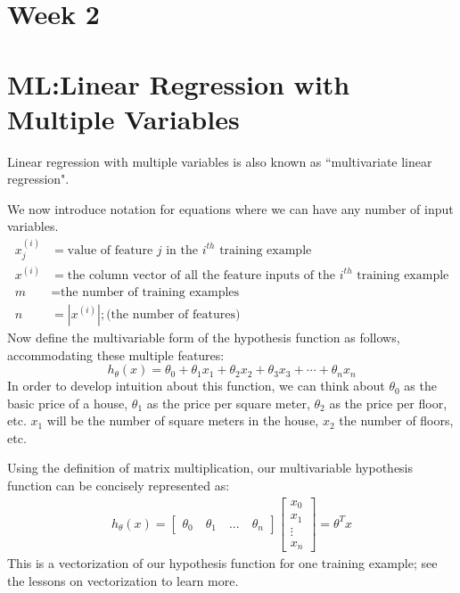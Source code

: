 \newpage
\section{Week 2}
\section*{ML:Linear Regression with Multiple Variables}
Linear regression with multiple variables is also known as ``multivariate linear regression".

We now introduce notation for equations where we can have any number of input variables.
\begin{align*}
x_j^{(i)} &= \text{value of feature } j \text{ in the }i^{th}\text{ training example} \\ 
x^{(i)}& = \text{the column vector of all the feature inputs of the }i^{th}\text{ training example} \\ 
m &= \text{the number of training examples} \\ 
n &= \left| x^{(i)} \right| ; \text{(the number of features)} 
\end{align*}
Now define the multivariable form of the hypothesis function as follows, accommodating these multiple features:
\begin{equation}
h_\theta (x) = \theta_0 + \theta_1 x_1 + \theta_2 x_2 + \theta_3 x_3 + \cdots + \theta_n x_n
\end{equation}
In order to develop intuition about this function, we can think about $\theta_0 $ as the basic price of a house, $\theta_1$ as the price per square meter, $\theta_2$ as the price per floor, etc. $x_1$ will be the number of square meters in the house, $x_2$ the number of floors, etc.

Using the definition of matrix multiplication, our multivariable hypothesis function can be concisely represented as:
\begin{align*}
h_\theta(x) =
\begin{bmatrix}
\theta_0 \quad \theta_1 \quad  ...  \quad  \theta_n
\end{bmatrix}
\begin{bmatrix}
x_0 \\ x_1 \\ \vdots \\ x_n
\end{bmatrix}
= \theta^T x
\end{align*}
This is a vectorization of our hypothesis function for one training example; see the lessons on vectorization to learn more.

